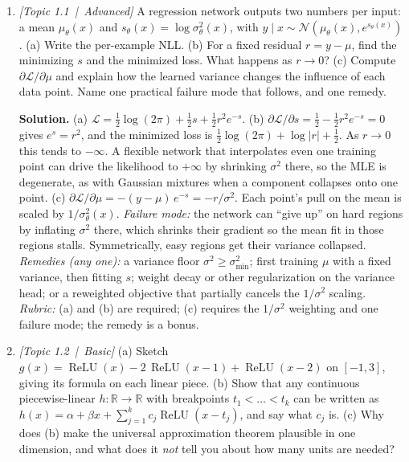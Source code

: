 \documentclass[11pt]{article}
\newcommand{\relu}{\operatorname{ReLU}}
\newcommand{\R}{\mathbb{R}}
\begin{document}
\begin{enumerate}[label=\textbf{Q\arabic*}, leftmargin=*]
  \item \textit{[Topic 1.1 \,|\, Advanced]} A regression network outputs two numbers per input: a mean $\mu_\theta(x)$ and $s_\theta(x) = \log\sigma^2_\theta(x)$, with $y\mid x\sim\mathcal N(\mu_\theta(x), e^{s_\theta(x)})$. (a) Write the per-example NLL. (b) For a fixed residual $r = y - \mu$, find the minimizing $s$ and the minimized loss. What happens as $r \to 0$? (c) Compute $\partial\mathcal L/\partial\mu$ and explain how the learned variance changes the influence of each data point. Name one practical failure mode that follows, and one remedy.

  \textbf{Solution.} (a) $\mathcal L = \tfrac12\log(2\pi) + \tfrac12 s + \tfrac12 r^2 e^{-s}$.
  (b) $\partial\mathcal L/\partial s = \tfrac12 - \tfrac12 r^2 e^{-s} = 0$ gives $e^{s} = r^2$, and the minimized loss is $\tfrac12\log(2\pi) + \log|r| + \tfrac12$. As $r\to 0$ this tends to $-\infty$. A flexible network that interpolates even one training point can drive the likelihood to $+\infty$ by shrinking $\sigma^2$ there, so the MLE is degenerate, as with Gaussian mixtures when a component collapses onto one point.
  (c) $\partial\mathcal L/\partial\mu = -(y - \mu)\,e^{-s} = -r/\sigma^2$. Each point's pull on the mean is scaled by $1/\sigma^2_\theta(x)$. \emph{Failure mode:} the network can ``give up'' on hard regions by inflating $\sigma^2$ there, which shrinks their gradient so the mean fit in those regions stalls. Symmetrically, easy regions get their variance collapsed. \emph{Remedies (any one):} a variance floor $\sigma^2 \ge \sigma^2_{\min}$; first training $\mu$ with a fixed variance, then fitting $s$; weight decay or other regularization on the variance head; or a reweighted objective that partially cancels the $1/\sigma^2$ scaling. \emph{Rubric:} (a) and (b) are required; (c) requires the $1/\sigma^2$ weighting and one failure mode; the remedy is a bonus.

  \item \textit{[Topic 1.2 \,|\, Basic]} (a) Sketch $g(x) = \relu(x) - 2\,\relu(x-1) + \relu(x-2)$ on $[-1, 3]$, giving its formula on each linear piece. (b) Show that any continuous piecewise-linear $h:\R\to\R$ with breakpoints $t_1<\dots<t_k$ can be written as $h(x) = \alpha + \beta x + \sum_{j=1}^k c_j\relu(x - t_j)$, and say what $c_j$ is. (c) Why does (b) make the universal approximation theorem plausible in one dimension, and what does it \emph{not} tell you about how many units are needed?


\end{enumerate}
\end{document}
